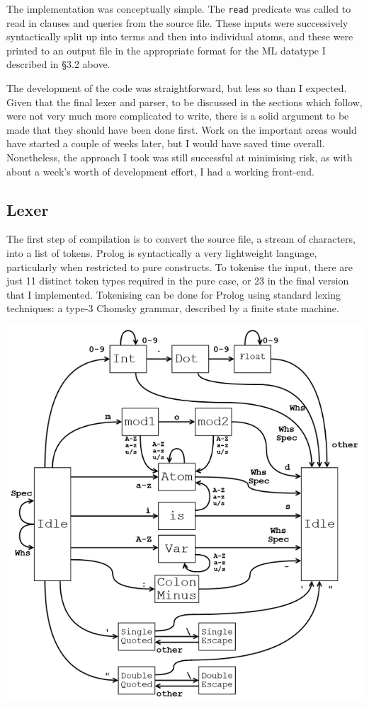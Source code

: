 \documentclass[12pt]{article}
\begin{document}
The implementation was conceptually simple. 
The \verb|read| predicate was called to read in clauses and queries from the source file. 
These inputs were successively syntactically split up into terms and then into individual atoms, and these were printed to an output file in the appropriate format for the ML datatype I described in \S3.2 above.

The development of the code was straightforward, but less so than I expected. 
Given that the final lexer and parser, to be discussed in the sections which follow, were not very much more complicated to write, there is a solid argument to be made that they should have been done first.
Work on the important areas would have started a couple of weeks later, but I would have saved time overall.
Nonetheless, the approach I took was still successful at minimising risk, as with about a week's worth of development effort, I had a working front-end.

\subsection{Lexer}

The first step of compilation is to convert the source file, a stream of characters, into a list of tokens. 
Prolog is syntactically a very lightweight language, particularly when restricted to pure constructs. 
To tokenise the input, there are just 11 distinct token types required in the pure case, or 23 in the final version that I implemented. 
Tokenising can be done for Prolog using standard lexing techniques: a type-3 Chomsky grammar, described by a finite state machine. 

\newpage

\vspace{-50px}
\includegraphics{lex65.png}%
\end{document}
